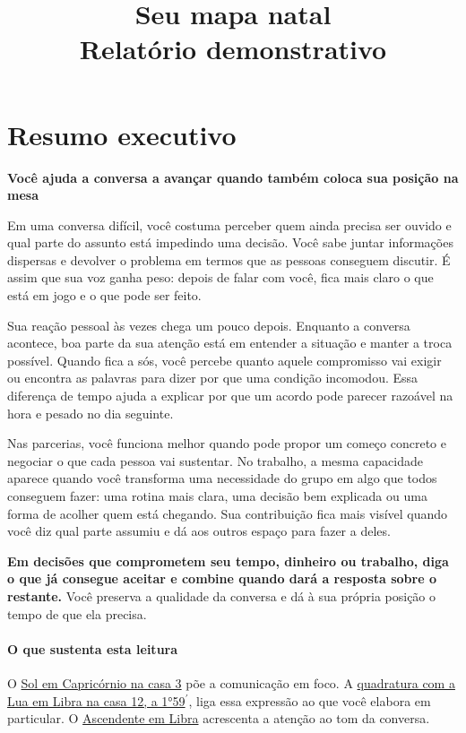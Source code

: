 \documentclass[11pt,a4paper]{article}
\title{Seu mapa natal\\\large Relatório demonstrativo}
\author{}
\date{}
\newcommand{\subtituloleitura}[1]{\textbf{#1}\par\nopagebreak[4]}
\begin{document}
\maketitle

\tableofcontents

\clearpage

\section{Resumo executivo}
\subtituloleitura{Você ajuda a conversa a avançar quando também coloca sua posição na mesa}

Em uma conversa difícil, você costuma perceber quem ainda precisa ser ouvido e qual parte do assunto está impedindo uma decisão. Você sabe juntar informações dispersas e devolver o problema em termos que as pessoas conseguem discutir. É assim que sua voz ganha peso: depois de falar com você, fica mais claro o que está em jogo e o que pode ser feito.

Sua reação pessoal às vezes chega um pouco depois. Enquanto a conversa acontece, boa parte da sua atenção está em entender a situação e manter a troca possível. Quando fica a sós, você percebe quanto aquele compromisso vai exigir ou encontra as palavras para dizer por que uma condição incomodou. Essa diferença de tempo ajuda a explicar por que um acordo pode parecer razoável na hora e pesado no dia seguinte.

Nas parcerias, você funciona melhor quando pode propor um começo concreto e negociar o que cada pessoa vai sustentar. No trabalho, a mesma capacidade aparece quando você transforma uma necessidade do grupo em algo que todos conseguem fazer: uma rotina mais clara, uma decisão bem explicada ou uma forma de acolher quem está chegando. Sua contribuição fica mais visível quando você diz qual parte assumiu e dá aos outros espaço para fazer a deles.

\textbf{Em decisões que comprometem seu tempo, dinheiro ou trabalho, diga o que já consegue aceitar e combine quando dará a resposta sobre o restante.} Você preserva a qualidade da conversa e dá à sua própria posição o tempo de que ela precisa.

\paragraph*{O que sustenta esta leitura} O \hyperref[pos-sol]{Sol em Capricórnio na casa 3} põe a comunicação em foco. A \hyperref[aspecto:sol-lua]{quadratura com a Lua em Libra na casa 12, a 1°59\ensuremath{^{\prime}}}, liga essa expressão ao que você elabora em particular. O \hyperref[eixo-asc]{Ascendente em Libra} acrescenta a atenção ao tom da conversa.
\clearpage
\clearpage
\end{document}
